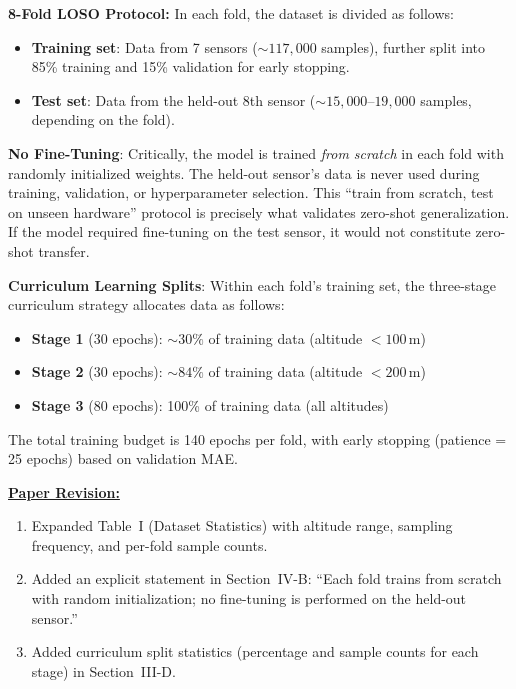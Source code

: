 \textbf{8-Fold LOSO Protocol:}
In each fold, the dataset is divided as follows:
\begin{itemize}
    \item \textbf{Training set}: Data from 7 sensors (${\sim}117{,}000$ samples), further split into 85\% training and 15\% validation for early stopping.
    \item \textbf{Test set}: Data from the held-out 8th sensor (${\sim}15{,}000$--$19{,}000$ samples, depending on the fold).
\end{itemize}

\textbf{No Fine-Tuning}:
Critically, the model is trained \emph{from scratch} in each fold with randomly initialized weights. The held-out sensor's data is never used during training, validation, or hyperparameter selection. This ``train from scratch, test on unseen hardware'' protocol is precisely what validates zero-shot generalization. If the model required fine-tuning on the test sensor, it would not constitute zero-shot transfer.

\textbf{Curriculum Learning Splits}:
Within each fold's training set, the three-stage curriculum strategy allocates data as follows:
\begin{itemize}
    \item \textbf{Stage 1} (30 epochs): ${\sim}30\%$ of training data (altitude $< 100$\,m)
    \item \textbf{Stage 2} (30 epochs): ${\sim}84\%$ of training data (altitude $< 200$\,m)
    \item \textbf{Stage 3} (80 epochs): 100\% of training data (all altitudes)
\end{itemize}

The total training budget is 140 epochs per fold, with early stopping (patience = 25 epochs) based on validation MAE.

\vspace{0.1cm}
\noindent
\underline{\textbf{Paper Revision:}}

\begin{enumerate}
    \item Expanded Table~I (Dataset Statistics) with altitude range, sampling frequency, and per-fold sample counts.
    \item Added an explicit statement in Section~IV-B: ``Each fold trains from scratch with random initialization; no fine-tuning is performed on the held-out sensor.''
    \item Added curriculum split statistics (percentage and sample counts for each stage) in Section~III-D.
\end{enumerate}

